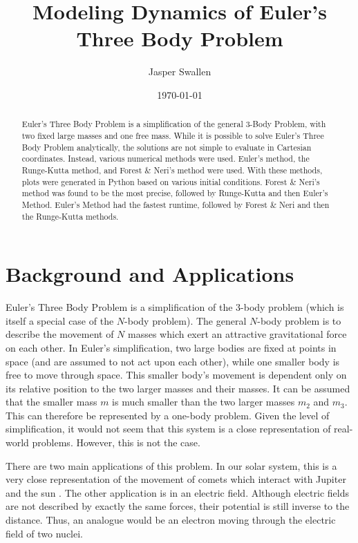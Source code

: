 \documentclass[preprint,titlepage,preprintnumbers,amsmath,amssymb,aps,11pt]{revtex4-2}
\begin{document}
\title{Modeling Dynamics of Euler's Three Body Problem}
\author{Jasper Swallen}
\date{\today}


\begin{abstract}
    Euler's Three Body Problem is a simplification of the general 3-Body Problem, with two fixed large masses and one free mass. While it is possible to solve Euler's Three Body Problem analytically, the solutions are not simple to evaluate in Cartesian coordinates. Instead, various numerical methods were used. Euler's method, the Runge-Kutta method, and Forest \& Neri's method were used. With these methods, plots were generated in Python based on various initial conditions. Forest \& Neri's method was found to be the most precise, followed by Runge-Kutta and then Euler's Method. Euler's Method had the fastest runtime, followed by Forest \& Neri and then the Runge-Kutta methods.
        {\singlespacing \tableofcontents}
\end{abstract}

\maketitle


\section{Background and Applications}
Euler's Three Body Problem is a simplification of the 3-body problem (which is itself a special case of the $N$-body problem). The general $N$-body problem is to describe the movement of $N$ masses which exert an attractive gravitational force on each other. In Euler's simplification, two large bodies are fixed at points in space (and are assumed to not act upon each other), while one smaller body is free to move through space. This smaller body's movement is dependent only on its relative position to the two larger masses and their masses. It can be assumed that the smaller mass $m$ is much smaller than the two larger masses $m_2$ and $m_3$. This can therefore be represented by a one-body problem. Given the level of simplification, it would not seem that this system is a close representation of real-world problems. However, this is not the case.

There are two main applications of this problem. In our solar system, this is a very close representation of the movement of comets which interact with Jupiter and the sun \cite{Worthington2012,Koon2000}. The other application is in an electric field. Although electric fields are not described by exactly the same forces, their potential is still inverse to the distance. Thus, an analogue would be an electron moving through the electric field of two nuclei.
\end{document}
